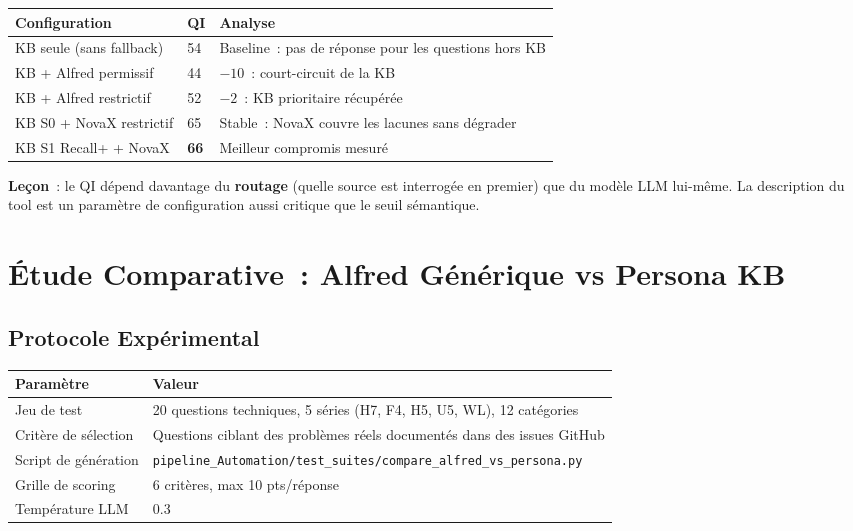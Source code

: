 \begin{longtable}{p{4.5cm}p{2cm}p{6.5cm}}
\toprule
\textbf{Configuration} & \textbf{QI} & \textbf{Analyse} \\
\midrule
KB seule (sans fallback) & 54 & Baseline~: pas de réponse pour les questions hors KB \\
KB + Alfred permissif & 44 & $-10$~: court-circuit de la KB \\
KB + Alfred restrictif & 52 & $-2$~: KB prioritaire récupérée \\
KB S0 + NovaX restrictif & 65 & Stable~: NovaX couvre les lacunes sans dégrader \\
KB S1 Recall+ + NovaX & \textbf{66} & Meilleur compromis mesuré \\
\bottomrule
\end{longtable}

\textbf{Leçon}~: le QI dépend davantage du \textbf{routage} (quelle source est interrogée en premier) que du modèle LLM lui-même. La description du tool est un paramètre de configuration aussi critique que le seuil sémantique.

\section{Étude Comparative~: Alfred Générique vs Persona KB}
\label{sec:etude_comparative}

\subsection{Protocole Expérimental}

\begin{longtable}{p{4cm}p{9cm}}
\toprule
\textbf{Paramètre} & \textbf{Valeur} \\
\midrule
Jeu de test & 20 questions techniques, 5 séries (H7, F4, H5, U5, WL), 12 catégories \\
Critère de sélection & Questions ciblant des problèmes réels documentés dans des issues GitHub \\
Script de génération & \texttt{pipeline\_Automation/test\_suites/compare\_alfred\_vs\_persona.py} \\
Grille de scoring & 6 critères, max 10 pts/réponse \\
Température LLM & 0.3 \\
\bottomrule
\end{longtable}

